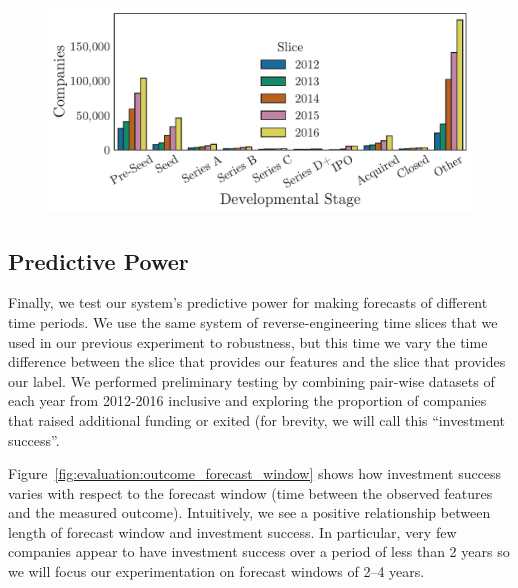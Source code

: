 \documentclass[../thesis/thesis.tex]{subfiles}
\begin{document}
\begin{figure}[!htb]
    \centering
    \includegraphics[width=\textwidth]{../figures/evaluation/slice_counts_over_time}
    \caption[Dataset counts over time]{}
    \label{fig:evaluation:slice_counts_over_time}
\end{figure}



\subsection{Predictive Power}

Finally, we test our system's predictive power for making forecasts of different time periods. We use the same system of reverse-engineering time slices that we used in our previous experiment to robustness, but this time we vary the time difference between the slice that provides our features and the slice that provides our label. We performed preliminary testing by combining pair-wise datasets of each year from 2012-2016 inclusive and exploring the proportion of companies that raised additional funding or exited (for brevity, we will call this ``investment success''.

Figure~\ref{fig:evaluation:outcome_forecast_window} shows how investment success varies with respect to the forecast window (time between the observed features and the measured outcome). Intuitively, we see a positive relationship between length of forecast window and investment success. In particular, very few companies appear to have investment success over a period of less than 2 years so we will focus our experimentation on forecast windows of 2--4 years.
\end{document}
